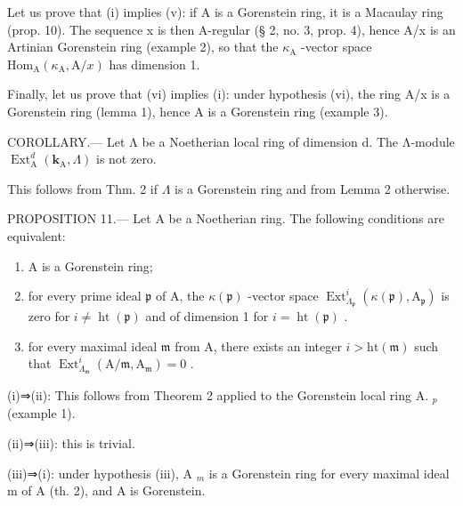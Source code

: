 Let us prove that (i) implies (v): if A is a Gorenstein ring, it is a Macaulay ring (prop. 10). The sequence x is then A-regular (§ 2, no. 3, prop. 4), hence A/x is an Artinian Gorenstein ring (example 2), so that the \(\kappa_{\mathrm{A}}\) -vector space \(\mathrm{Hom}_{\mathrm{A}}(\kappa_{\mathrm{A}}, \mathrm{A}/x)\) has dimension 1.

Finally, let us prove that (vi) implies (i): under hypothesis (vi), the ring A/x is a Gorenstein ring (lemma 1), hence A is a Gorenstein ring (example 3).

COROLLARY.--- Let Λ be a Noetherian local ring of dimension d. The Λ-module \(\operatorname{Ext}_{\mathrm{A}}^{d}(\mathbf{k}_{\mathrm{A}},\Lambda)\) is not zero.

This follows from Thm. 2 if \(\Lambda\) is a Gorenstein ring and from Lemma 2 otherwise.

PROPOSITION 11.--- Let A be a Noetherian ring. The following conditions are equivalent:

\begin{enumerate}
\def\labelenumi{(\roman{enumi})}
\item
  A is a Gorenstein ring;
\item
  for every prime ideal \(\mathfrak{p}\) of A, the \(\kappa(\mathfrak{p})\) -vector space \(\operatorname{Ext}_{\Lambda_{\mathfrak{p}}}^{i}(\kappa(\mathfrak{p}),\mathrm{A}_{\mathfrak{p}})\) is zero for \(i \neq \operatorname{ht}(\mathfrak{p})\) and of dimension 1 for \(i = \operatorname{ht}(\mathfrak{p})\) .
\item
  for every maximal ideal \(\mathfrak{m}\) from A, there exists an integer \(i > \mathrm{ht}(\mathfrak{m})\) such that \(\operatorname{Ext}_{\Lambda_{\mathfrak{m}}}^{i}(\mathrm{A}/\mathfrak{m},\mathrm{A}_{\mathfrak{m}}) = 0\) .
\end{enumerate}

(i)⇒(ii): This follows from Theorem 2 applied to the Gorenstein local ring A. \(_{p}\) (example 1).

(ii)⇒(iii): this is trivial.

(iii)⇒(i): under hypothesis (iii), A \(_{m}\) is a Gorenstein ring for every maximal ideal m of A (th. 2), and A is Gorenstein.

